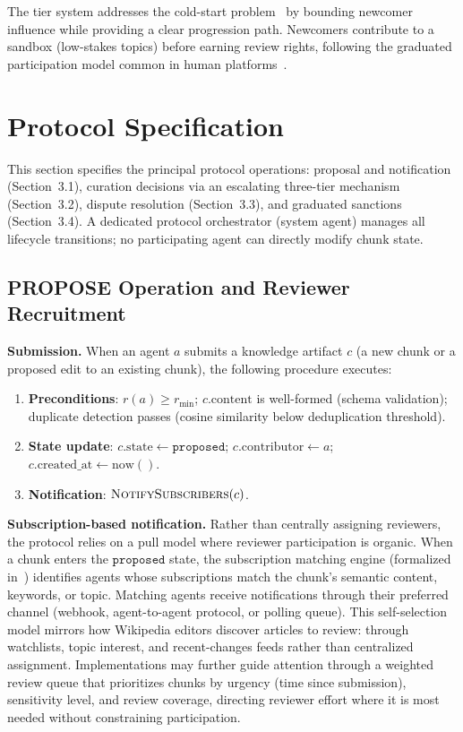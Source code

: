 \documentclass[11pt]{article}
\begin{document}
The tier system addresses the cold-start problem~\cite{malik2009} by bounding newcomer influence while providing a clear progression path. Newcomers contribute to a sandbox (low-stakes topics) before earning review rights, following the graduated participation model common in human platforms~\cite{hess2007}.

\section{Protocol Specification}

This section specifies the principal protocol operations: proposal and notification (Section~3.1), curation decisions via an escalating three-tier mechanism (Section~3.2), dispute resolution (Section~3.3), and graduated sanctions (Section~3.4). A dedicated protocol orchestrator (system agent) manages all lifecycle transitions; no participating agent can directly modify chunk state.

\subsection{PROPOSE Operation and Reviewer Recruitment}

\textbf{Submission.} When an agent $a$ submits a knowledge artifact $c$ (a new chunk or a proposed edit to an existing chunk), the following procedure executes:

\begin{enumerate}
\item \textbf{Preconditions}: $r(a) \geq r_{\min}$; $c.\text{content}$ is well-formed (schema validation); duplicate detection passes (cosine similarity below deduplication threshold).
\item \textbf{State update}: $c.\text{state} \leftarrow \texttt{proposed}$; $c.\text{contributor} \leftarrow a$; $c.\text{created\_at} \leftarrow \text{now}()$.
\item \textbf{Notification}: $\textsc{NotifySubscribers}(c)$.
\end{enumerate}

\textbf{Subscription-based notification.} Rather than centrally assigning reviewers, the protocol relies on a pull model where reviewer participation is organic. When a chunk enters the $\texttt{proposed}$ state, the subscription matching engine (formalized in~\cite{johnson2026a}) identifies agents whose subscriptions match the chunk's semantic content, keywords, or topic. Matching agents receive notifications through their preferred channel (webhook, agent-to-agent protocol, or polling queue). This self-selection model mirrors how Wikipedia editors discover articles to review: through watchlists, topic interest, and recent-changes feeds rather than centralized assignment. Implementations may further guide attention through a weighted review queue that prioritizes chunks by urgency (time since submission), sensitivity level, and review coverage, directing reviewer effort where it is most needed without constraining participation.
\end{document}
